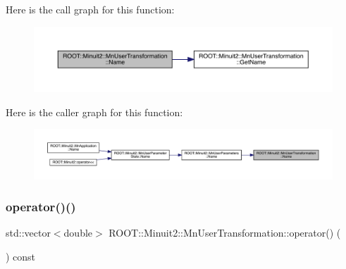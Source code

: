 Here is the call graph for this function\+:
\nopagebreak
\begin{figure}[H]
\begin{center}
\leavevmode
\includegraphics[width=350pt]{d9/d98/classROOT_1_1Minuit2_1_1MnUserTransformation_a83b4e1b3d5b020b4151d5dc30ff5488a_cgraph}
\end{center}
\end{figure}
Here is the caller graph for this function\+:
\nopagebreak
\begin{figure}[H]
\begin{center}
\leavevmode
\includegraphics[width=350pt]{d9/d98/classROOT_1_1Minuit2_1_1MnUserTransformation_a83b4e1b3d5b020b4151d5dc30ff5488a_icgraph}
\end{center}
\end{figure}
\mbox{\label{classROOT_1_1Minuit2_1_1MnUserTransformation_ae5f766bba2c9c99bf009e8799afc5348}} 
\subsubsection{\texorpdfstring{operator()()}{operator()()}\hspace{0.1cm}{\footnotesize\ttfamily [1/3]}}
{\footnotesize\ttfamily std\+::vector$<$double$>$ R\+O\+O\+T\+::\+Minuit2\+::\+Mn\+User\+Transformation\+::operator() (\begin{DoxyParamCaption}\item[{const \mbox{\hyperlink{namespaceROOT_1_1Minuit2_a62ed97730a1ca8d3fbaec64a19aa11c9}{Mn\+Algebraic\+Vector}} \&}]{ }\end{DoxyParamCaption}) const}

\mbox{\label{classROOT_1_1Minuit2_1_1MnUserTransformation_ae5f766bba2c9c99bf009e8799afc5348}} 
